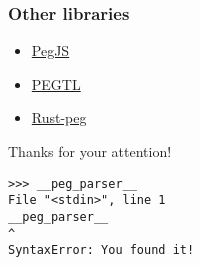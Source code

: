 \begin{frame}
\frametitle{Other libraries}\begin{itemize}
		\item \href{https://github.com/pegjs/pegjs}{PegJS}
		\vspace{20pt}
		\item \href{https://github.com/taocpp/PEGTL}{PEGTL}
		\vspace{20pt}
		\item \href{https://github.com/kevinmehall/rust-peg}{Rust-peg}
	\end{itemize}
\end{frame}
\begin{frame}[fragile]
	\huge
	
	Thanks for your attention!
	
	\large 
	\begin{verbatim}
>>> __peg_parser__
File "<stdin>", line 1
__peg_parser__
^
SyntaxError: You found it!
\end{verbatim}

\end{frame}
